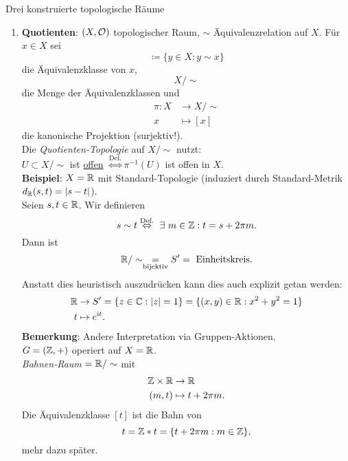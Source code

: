 \begin{bla}{Drei konstruierte topologische Räume}
\begin{enumerate}
    \item \textbf{Quotienten}: $ (X, \mathcal{O}) $ topologischer Raum, $ \sim $ Äquivalenzrelation auf $ X $. Für $ x \in X $ sei
    \begin{equation*}
      [x] \coloneqq  \{ y \in X : y \sim x \}
    \end{equation*}
    die Äquivalenzklasse von $ x $,
    \begin{equation*}
      X/\sim
    \end{equation*}
    die Menge der Äquivalenzklassen und
    \begin{align*}
      \pi : X &\to X/\sim \\
      x &\mapsto [x]
    \end{align*}
    die kanonische Projektion (surjektiv!). \\
    Die \emph{Quotienten-Topologie} auf $ X/\sim $ nutzt: \\
    $ U \subset X/\sim $ ist \underline{offen} $ \overset{\text{Def.}}{\Leftrightarrow} \pi^{-1}(U) $ ist offen in $ X $. \\
    \textbf{Beispiel}: $ X = \mathbb{R} $ mit Standard-Topologie (induziert durch Standard-Metrik $ d_{\mathbb{R}}(s,t) = \vert s-t \vert $). \\
    Seien $ s, t \in \mathbb{R} $. Wir definieren
    \begin{equation*}
      s \sim t \overset{\text{Def.}}{\Leftrightarrow} \ \exists \ m \in \mathbb{Z} : t = s + 2\pi m\text{.}
    \end{equation*}
    Dann ist
    \begin{equation*}
      \mathbb{R}/\sim \underset{\text{bijektiv}}{=} S' = \text{ Einheitskreis}\text{.}
    \end{equation*}
    Anstatt dies heuristisch auszudrücken kann dies auch explizit getan werden:
    \begin{align*}
      \mathbb{R} &\to S' = \{ z \in \mathbb{C} : \vert z \vert = 1 \} = \{ (x, y) \in \mathbb{R} : x^2+y^2 = 1 \} \\
      t &\mapsto e^{\text{\rmfamily i} t}\text{.}
    \end{align*}
    \textbf{Bemerkung}: Andere Interpretation via Gruppen-Aktionen. \\
    $ G = (\mathbb{Z}, +) $ operiert auf $ X = \mathbb{R} $. \\
    \emph{Bahnen-Raum} $ = \mathbb{R}/\sim $ mit
    \begin{align*}
      \mathbb{Z} \times \mathbb{R} &\to \mathbb{R} \\
      (m, t) &\mapsto t + 2\pi m\text{.}
    \end{align*}
    Die Äquivalenzklasse $ [t] $ ist die Bahn von
    \begin{equation*}
      t = \mathbb{Z}*t = \{ t+2\pi m : m \in \mathbb{Z} \}\text{,}
    \end{equation*}
    mehr dazu später.
  \end{enumerate}
\end{bla}

